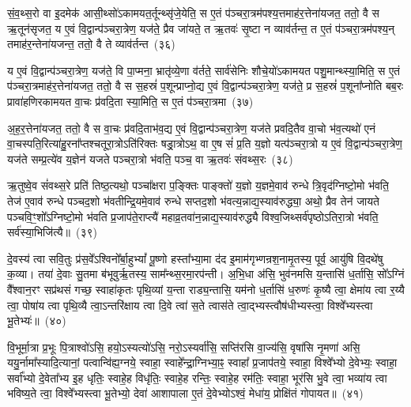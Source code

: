 {\anuvakamend[{ज॒मद॑ग्निर॒ष्टाच॑त्वारिꣳशत्}]}%

सं॒व॒थ्स॒रो वा इ॒दमेक॑ आसी॒थ्सो॑\-ऽकामयत॒र्तून्थ्सृ॑जे॒येति॒ स ए॒तं प॑ञ्चरा॒त्रम॑पश्य॒त्तमाह॑र॒त्तेना॑यजत॒ ततो॒ वै स ऋ॒तून॑सृजत॒ य ए॒वं वि॒द्वान्प॑ञ्चरा॒त्रेण॒ यज॑ते॒ प्रैव जा॑यते॒ त ऋ॒तवः॑ सृ॒ष्टा न व्याव॑र्तन्त॒ त ए॒तं प॑ञ्चरा॒त्रम॑पश्य॒न् तमाह॑र॒न्तेना॑यजन्त॒ ततो॒ वै ते व्याव॑र्तन्त~(३६)

य ए॒वं वि॒द्वान्प॑ञ्चरा॒त्रेण॒ यज॑ते॒ वि पा॒प्मना॒ भ्रातृ॑व्ये॒णा व॑र्तते॒ सार्व॑सेनिः शौचे॒यो॑\-ऽकामयत पशु॒मान्थ्स्या॒मिति॒ स ए॒तं प॑ञ्चरा॒त्रमाह॑र॒त्तेना॑यजत॒ ततो॒ वै स स॒हस्रं॑ प॒शून्प्राप्नो॒द्य ए॒वं वि॒द्वान्प॑ञ्चरा॒त्रेण॒ यज॑ते॒ प्र स॒हस्रं॑ प॒शूना᳚प्नोति बब॒रः प्रावा॑हणिरकामयत वा॒चः प्र॑वदि॒ता स्या॒मिति॒ स ए॒तं प॑ञ्चरा॒त्रमा~(३७)

अ॒ह॒र॒त्तेना॑यजत॒ ततो॒ वै स वा॒चः प्र॑वदि॒ताभ॑व॒द्य ए॒वं वि॒द्वान्प॑ञ्चरा॒त्रेण॒ यज॑ते प्रवदि॒तैव वा॒चो भ॑व॒त्यथो॑ एनं वा॒चस्पति॒रित्या॑हु॒रना᳚प्तश्चतूरा॒त्रो\-ऽति॑रिक्तः षड्रा॒त्रो\-ऽथ॒ वा ए॒ष सं॑ प्र॒ति य॒ज्ञो यत्प॑ञ्चरा॒त्रो य ए॒वं वि॒द्वान्प॑ञ्चरा॒त्रेण॒ यज॑ते सम्प्र॒त्ये॑व य॒ज्ञेन॑ यजते पञ्चरा॒त्रो भ॑वति॒ पञ्च॒ वा ऋ॒तवः॑ संवथ्स॒रः~(३८)

ऋ॒तुष्वे॒व सं॑वथ्स॒रे प्रति॑ तिष्ठ॒त्यथो॒ पञ्चा᳚क्षरा प॒ङ्क्तिः पाङ्क्तो॑ य॒ज्ञो य॒ज्ञमे॒वाव॑ रुन्धे त्रि॒वृद॑ग्निष्टो॒मो भ॑वति॒ तेज॑ ए॒वाव॑ रुन्धे पञ्चद॒शो भ॑वतीन्द्रि॒यमे॒वाव॑ रुन्धे सप्तद॒शो भ॑वत्य॒न्नाद्य॒स्याव॑रुद्ध्या॒ अथो॒ प्रैव तेन॑ जायते पञ्चवि॒ꣳ॒शो᳚\-ऽग्निष्टो॒मो भ॑वति प्र॒जा\-प॑ते॒राप्त्यै॑ महाव्र॒तवा॑न॒न्नाद्य॒स्याव॑रुद्ध्यै विश्व॒जिथ्सर्व॑पृष्ठो\-ऽतिरा॒त्रो भ॑वति॒ सर्व॑स्या॒भिजि॑त्यै॥~(३९)

{\anuvakamend[{ते व्याव॑र्तन्त प्रवदि॒ता स्या॒मिति॒ स ए॒तं प॑ञ्चरा॒त्रमा सं॑वथ्स॒रो॑\-ऽभिजि॑त्यै}]}%

दे॒वस्य॑ त्वा सवि॒तुः प्र॑स॒वे᳚\-ऽश्विनो᳚र्बा॒हु\-भ्यां᳚ पू॒ष्णो हस्ता᳚भ्या॒मा द॑द इ॒माम॑गृभ्णन्रश॒नामृ॒तस्य॒ पूर्व॒ आयु॑षि वि॒दथे॑षु क॒व्या। तया॑ दे॒वाः सु॒तमा ब॑भूवुर्\mbox{}ऋ॒तस्य॒ साम᳚न्थ्स॒रमा॒रप॑न्ती। अ॒भि॒धा अ॑सि॒ भुव॑नमसि य॒न्तासि॑ ध॒र्तासि॒ सो᳚\-ऽग्निं वै᳚श्वान॒रꣳ सप्र॑थसं गच्छ॒ स्वाहा॑कृतः पृथि॒व्यां य॒न्ता राड्य॒न्तासि॒ यम॑नो ध॒र्तासि॑ ध॒रुणः॑ कृ॒ष्यै त्वा॒ क्षेमा॑य त्वा र॒य्यै त्वा॒ पोषा॑य त्वा पृथि॒व्यै त्वा॒ऽन्तरि॑क्षाय त्वा दि॒वे त्वा॑ स॒ते त्वास॑ते त्वा॒द्भ्यस्त्वौष॑धीभ्यस्त्वा॒ विश्वे᳚भ्यस्त्वा भू॒तेभ्यः॑॥~(४०)

{\anuvakamend[{ध॒रुणः॒ प़ञ्च॑विꣳशतिश्च}]}%

वि॒भूर्मा॒त्रा प्र॒भूः पि॒त्राश्वो॑\-ऽसि॒ हयो॒\-ऽस्यत्यो॑\-ऽसि॒ नरो॒\-ऽस्यर्वा॑सि॒ सप्ति॑रसि वा॒ज्य॑सि॒ वृषा॑सि नृ॒मणा॑ असि॒ ययु॒र्नामा᳚स्यादि॒त्यानां॒ पत्वान्वि॑ह्य॒ग्नये॒ स्वाहा॒ स्वाहे᳚न्द्रा॒ग्निभ्या॒ꣴ॒ स्वाहा᳚ प्र॒जा\-प॑तये॒ स्वाहा॒ विश्वे᳚भ्यो दे॒वेभ्यः॒ स्वाहा॒ सर्वा᳚भ्यो दे॒वेता᳚भ्य इ॒ह धृतिः॒ स्वाहे॒ह विधृ॑तिः॒ स्वाहे॒ह रन्तिः॒ स्वाहे॒ह रम॑तिः॒ स्वाहा॒ भूर॑सि भु॒वे त्वा॒ भव्या॑य त्वा भविष्य॒ते त्वा॒ विश्वे᳚भ्यस्त्वा भू॒तेभ्यो॒ देवा॑ आशापाला ए॒तं दे॒वेभ्यो\-ऽश्वं॒ मेधा॑य॒ प्रोक्षि॑तं गोपायत॥~(४१)

